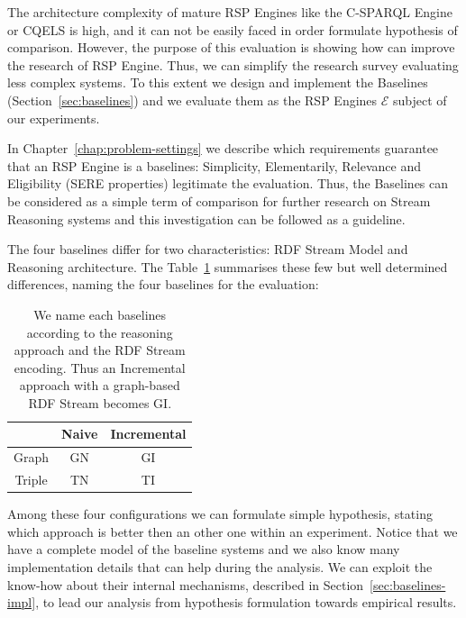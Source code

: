 The architecture complexity of mature RSP Engines like the C-SPARQL Engine or CQELS is high, and it can not be easily faced in order formulate hypothesis of comparison. However, the purpose of this evaluation is showing how \name can improve the research of RSP Engine. Thus, we can simplify the research survey evaluating less complex systems. To this extent we design and implement the Baselines (Section~\ref{sec:baselines}) and we evaluate them as the RSP Engines $\mathcal{E}$ subject of our experiments. 

In Chapter~\ref{chap:problem-settings} we describe which requirements guarantee that an RSP Engine is a baselines: Simplicity, Elementarily, Relevance and Eligibility (SERE properties) legitimate the evaluation. Thus, the Baselines can be considered as a simple term of comparison for further research on Stream Reasoning systems and this investigation can be followed as a guideline.
 
The four baselines differ for two characteristics: RDF Stream Model and Reasoning architecture. The Table~\ref{tab:baselines-names} summarises these few but well determined differences, naming the four baselines for the evaluation:
\begin{table}[htb]
\centering
\normalsize
\begin{tabular}{c|cc} %
	\hline
         & Naive & Incremental\\
	\hline
	Graph        &  GN      & GI\\
	Triple   &  TN   & TI\\
	\hline %
\end{tabular}
\caption[Baselines Naming Convention]{We name each baselines according to  the reasoning approach and the RDF Stream encoding. Thus an Incremental approach with a graph-based RDF Stream becomes GI.}
\label{tab:baselines-names}
\end{table}

\noindent Among these four configurations we can formulate simple hypothesis, stating which approach is better then an other one within an experiment. Notice that we have a complete model of the baseline systems and we also know many implementation details that can help during the analysis. We can exploit the know-how about their internal mechanisms, described in Section~\ref{sec:baselines-impl}, to lead our analysis from hypothesis formulation towards empirical results. 

